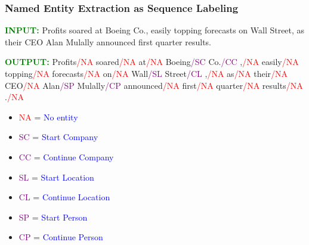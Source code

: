 \documentclass[handout]{beamer}
\begin{document}
\begin{frame}
  \frametitle{Named Entity Extraction as Sequence Labeling}
  \scriptsize
   \textcolor{green}{\textbf{INPUT:}}
  Profits soared at Boeing Co., easily topping forecasts on Wall Street, as their CEO Alan Mulally announced first quarter results. \vspace{0.5cm}

  \textcolor{green}{\textbf{OUTPUT:}}
  Profits\textcolor{red}{/NA} soared\textcolor{red}{/NA} at\textcolor{red}{/NA} Boeing\textcolor{purple}{/SC} Co.\textcolor{purple}{/CC} ,\textcolor{red}{/NA} easily\textcolor{red}{/NA} topping\textcolor{red}{/NA} forecasts\textcolor{red}{/NA} on\textcolor{red}{/NA} Wall\textcolor{purple}{/SL} Street\textcolor{purple}{/CL} ,\textcolor{red}{/NA} as\textcolor{red}{/NA} their\textcolor{red}{/NA} CEO\textcolor{red}{/NA} Alan\textcolor{purple}{/SP} Mulally\textcolor{purple}{/CP} announced\textcolor{red}{/NA} first\textcolor{red}{/NA} quarter\textcolor{red}{/NA} results\textcolor{red}{/NA} .\textcolor{red}{/NA} \vspace{0.5cm}

  \begin{itemize}
    \item \textcolor{red}{NA} = \textcolor{blue}{No entity}
    \item \textcolor{purple}{SC} = \textcolor{blue}{Start Company}
    \item \textcolor{purple}{CC} = \textcolor{blue}{Continue Company}
    \item \textcolor{purple}{SL} = \textcolor{blue}{Start Location}
    \item \textcolor{purple}{CL} = \textcolor{blue}{Continue Location}
    \item \textcolor{purple}{SP} = \textcolor{blue}{Start Person}
    \item \textcolor{purple}{CP} = \textcolor{blue}{Continue Person}
  \end{itemize}
\end{frame}
\end{document}
